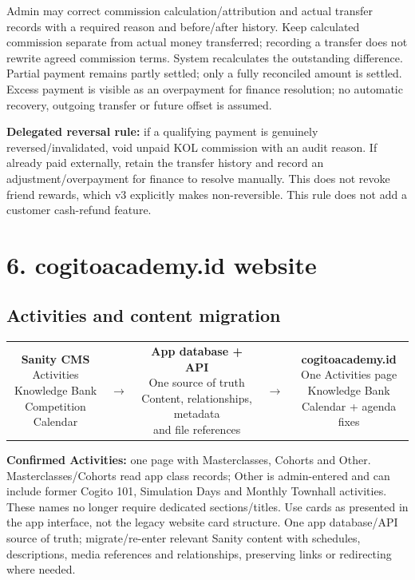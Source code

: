 \documentclass[11pt,a4paper]{article}
\newcommand{\flowbox}[2]{\fbox{\parbox[c]{#1}{\centering\small #2}}}
\begin{document}
Admin may correct commission calculation/\allowbreak{}attribution and actual transfer records with a required reason and before/\allowbreak{}after history. Keep calculated commission separate from actual money transferred; recording a transfer does not rewrite agreed commission terms. System recalculates the outstanding difference. Partial payment remains partly settled; only a fully reconciled amount is settled. Excess payment is visible as an overpayment for finance resolution; no automatic recovery, outgoing transfer or future offset is assumed.

\textbf{Delegated reversal rule:} if a qualifying payment is genuinely reversed/\allowbreak{}invalidated, void unpaid KOL commission with an audit reason. If already paid externally, retain the transfer history and record an adjustment/\allowbreak{}overpayment for finance to resolve manually. This does not revoke friend rewards, which v3 explicitly makes non-reversible. This rule does not add a customer cash-refund feature.

\section*{6. cogitoacademy.id website}

\subsection*{Activities and content migration}

\begin{center}
\begin{tabular}{@{}c@{\;}c@{\;}c@{\;}c@{\;}c@{}}
\flowbox{43mm}{\textbf{Sanity CMS}\\Activities\\Knowledge Bank\\Competition Calendar} & $\rightarrow$ & \flowbox{43mm}{\textbf{App database + API}\\One source of truth\\Content, relationships, metadata\\and file references} & $\rightarrow$ & \flowbox{43mm}{\textbf{cogitoacademy.id}\\One Activities page\\Knowledge Bank\\Calendar + agenda fixes} \\
\end{tabular}
\end{center}

\textbf{Confirmed Activities:} one page with Masterclasses, Cohorts and Other. Masterclasses/\allowbreak{}Cohorts read app class records; Other is admin-entered and can include former Cogito 101, Simulation Days and Monthly Townhall activities. These names no longer require dedicated sections/\allowbreak{}titles. Use cards as presented in the app interface, not the legacy website card structure. One app database/\allowbreak{}API source of truth; migrate/\allowbreak{}re-enter relevant Sanity content with schedules, descriptions, media references and relationships, preserving links or redirecting where needed.
\end{document}
